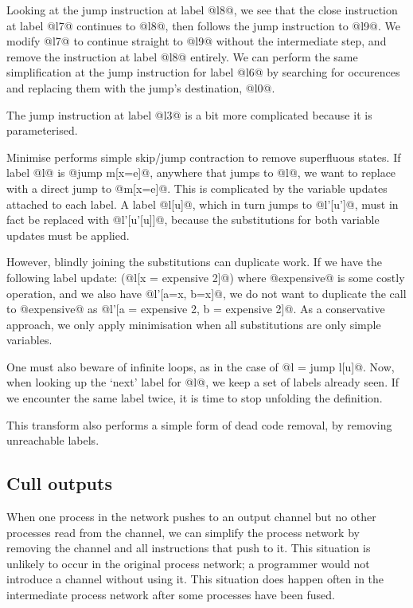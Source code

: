 Looking at the jump instruction at label @l8@, we see that the close instruction at label @l7@ continues to @l8@, then follows the jump instruction to @l9@.
We modify @l7@ to continue straight to @l9@ without the intermediate step, and remove the instruction at label @l8@ entirely.
We can perform the same simplification at the jump instruction for label @l6@ by searching for occurences and replacing them with the jump's destination, @l0@.

The jump instruction at label @l3@ is a bit more complicated because it is parameterised.

Minimise performs simple skip/jump contraction to remove superfluous states.
If label @l@ is @jump m[x=e]@, anywhere that jumps to @l@, we want to replace with a direct jump to @m[x=e]@.
This is complicated by the variable updates attached to each label.
A label @l[u]@, which in turn jumps to @l'[u']@, must in fact be replaced with @l'[u'[u]]@, because the substitutions for both variable updates must be applied.

However, blindly joining the substitutions can duplicate work.
If we have the following label update: (@l[x = expensive 2]@) where @expensive@ is some costly operation, and we also have @l'[a=x, b=x]@, we do not want to duplicate the call to @expensive@ as @l'[a = expensive 2, b = expensive 2]@.
As a conservative approach, we only apply minimisation when all substitutions are only simple variables.

One must also beware of infinite loops, as in the case of @l = jump l[u]@.
Now, when looking up the `next' label for @l@, we keep a set of labels already seen.
If we encounter the same label twice, it is time to stop unfolding the definition.

This transform also performs a simple form of dead code removal, by removing unreachable labels.


\subsection{Cull outputs}

When one process in the network pushes to an output channel but no other processes read from the channel, we can simplify the process network by removing the channel and all instructions that push to it.
This situation is unlikely to occur in the original process network; a programmer would not introduce a channel without using it.
This situation does happen often in the intermediate process network after some processes have been fused.

